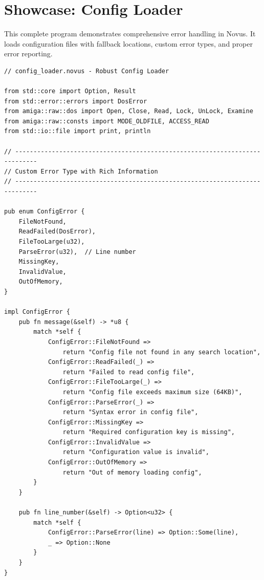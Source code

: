 \section{Showcase: Config Loader}
\label{sec:showcase-config-loader}

This complete program demonstrates comprehensive error handling in Novus. It loads configuration files with fallback locations, custom error types, and proper error reporting.

\begin{lstlisting}
// config_loader.novus - Robust Config Loader

from std::core import Option, Result
from std::error::errors import DosError
from amiga::raw::dos import Open, Close, Read, Lock, UnLock, Examine
from amiga::raw::consts import MODE_OLDFILE, ACCESS_READ
from std::io::file import print, println

// ----------------------------------------------------------------------------
// Custom Error Type with Rich Information
// ----------------------------------------------------------------------------

pub enum ConfigError {
    FileNotFound,
    ReadFailed(DosError),
    FileTooLarge(u32),
    ParseError(u32),  // Line number
    MissingKey,
    InvalidValue,
    OutOfMemory,
}

impl ConfigError {
    pub fn message(&self) -> *u8 {
        match *self {
            ConfigError::FileNotFound =>
                return "Config file not found in any search location",
            ConfigError::ReadFailed(_) =>
                return "Failed to read config file",
            ConfigError::FileTooLarge(_) =>
                return "Config file exceeds maximum size (64KB)",
            ConfigError::ParseError(_) =>
                return "Syntax error in config file",
            ConfigError::MissingKey =>
                return "Required configuration key is missing",
            ConfigError::InvalidValue =>
                return "Configuration value is invalid",
            ConfigError::OutOfMemory =>
                return "Out of memory loading config",
        }
    }

    pub fn line_number(&self) -> Option<u32> {
        match *self {
            ConfigError::ParseError(line) => Option::Some(line),
            _ => Option::None
        }
    }
}


\end{lstlisting}
